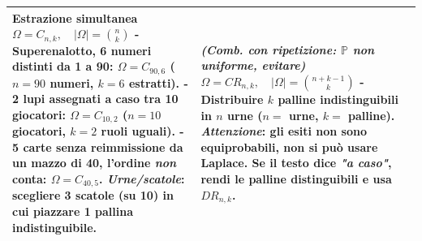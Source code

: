 \documentclass[12pt]{extarticle} %
\begin{document}
\begin{table}[htbp]
\begin{tabular}{|p{2.2cm}|p{6.4cm}|p{6.4cm}|}
\textbf{Estrazione simultanea}\newline
$\Omega = C_{n,k}, \quad |\Omega| = \binom{n}{k}$\newline
{\footnotesize
- Superenalotto, 6 numeri distinti da 1 a 90: $\Omega=C_{90,6}$ ($n=90$ numeri, $k=6$ estratti).\newline
- 2 lupi assegnati a caso tra 10 giocatori: $\Omega=C_{10,2}$ ($n=10$ giocatori, $k=2$ ruoli uguali).\newline
- 5 carte senza reimmissione da un mazzo di 40, l'ordine \emph{non} conta: $\Omega=C_{40,5}$.\newline
\textit{Urne/scatole}: scegliere 3 scatole (su 10) in cui piazzare 1 pallina indistinguibile.} &
\textit{(Comb. con ripetizione: $\mathbb{P}$ non uniforme, evitare)}\newline
$\Omega = CR_{n,k}, \quad |\Omega| = \binom{n+k-1}{k}$\newline
{\footnotesize
- Distribuire $k$ palline \textbf{indistinguibili} in $n$ urne ($n=$ urne, $k=$ palline).\newline
\textit{Attenzione}: gli esiti \textbf{non} sono equiprobabili, non si può usare Laplace. Se il testo dice \emph{"a caso"}, rendi le palline distinguibili e usa $DR_{n,k}$.} \\
\hline
\end{tabular}
\end{table}


\vspace{0.4cm}
\end{document}
